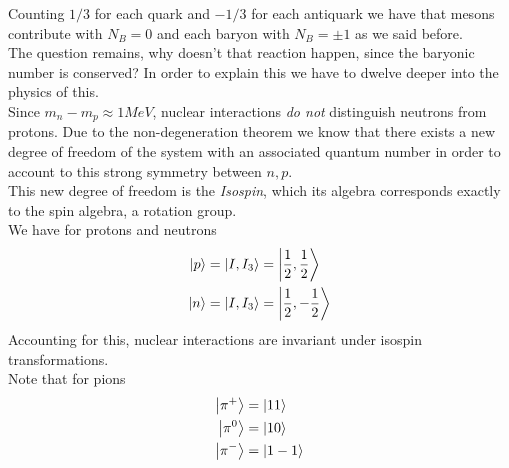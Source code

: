 \documentclass[../qm.tex]{subfiles}
\begin{document}
Counting $1/3$ for each quark and $-1/3$ for each antiquark we have that mesons contribute with $N_B=0$ and each baryon with $N_B=\pm1$ as we said before.\\
The question remains, why doesn't that reaction happen, since the baryonic number is conserved? In order to explain this we have to dwelve deeper into the physics of this.\\
Since $m_n-m_p\approx1\unit{MeV}$, nuclear interactions \textit{do not} distinguish neutrons from protons. Due to the non-degeneration theorem we know that there exists a new degree of freedom of the system with an associated quantum number in order to account to this strong symmetry between $n,p$.\\
This new degree of freedom is the \emph{Isospin}, which its algebra corresponds exactly to the spin algebra, a rotation group.\\
We have for protons and neutrons
\begin{equation}
	\begin{aligned}
		\ket{p}&=\ket{I,I_3}=\ket{\frac{1}{2},\frac{1}{2}}\\
		\ket{n}&=\ket{I,I_3}=\ket{\frac{1}{2},-\frac{1}{2}}
	\end{aligned}
	\label{eq:isospinpn}
\end{equation}
Accounting for this, nuclear interactions are invariant under isospin transformations.\\
Note that for pions
\begin{equation}
	\begin{aligned}
		\ket{\pi^+}&=\ket{11}\\
		\ket{\pi^0}&=\ket{10}\\
		\ket{\pi^-}&=\ket{1-1}
	\end{aligned}
	\label{eq:pionisospin}
\end{equation}
\end{document}
